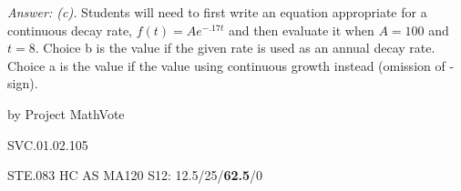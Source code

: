 {\it Answer:  (c).} Students will need to first write an equation appropriate for a continuous decay rate, $f(t)=Ae^{-.17t}$ and then evaluate it when $A=100$ and $t=8$.  Choice b is the value if the given rate is used as an annual decay rate.  Choice a is the value if the value using continuous growth instead (omission of - sign).

\medskip
by Project MathVote

SVC.01.02.105

STE.083
HC AS MA120 S12: 12.5/25/{\bf62.5}/0  \\

